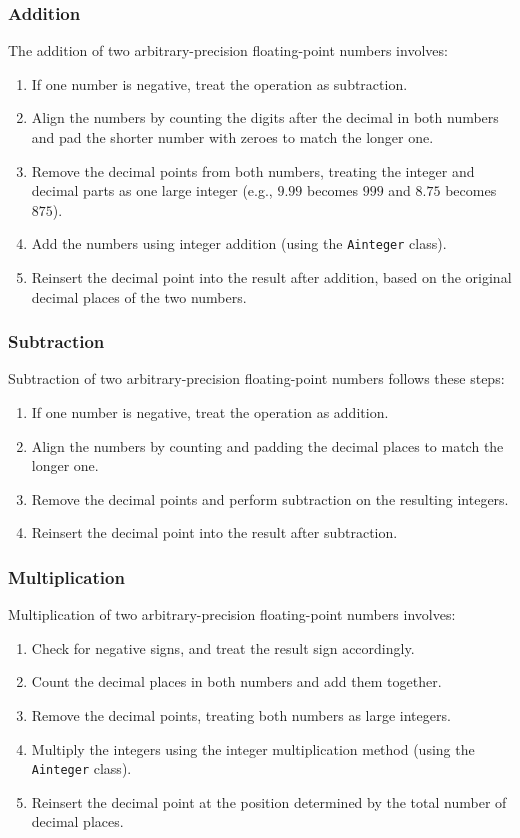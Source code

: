 \documentclass[12pt]{article}
\begin{document}
\subsubsection{Addition}
The addition of two arbitrary-precision floating-point numbers involves:
\begin{enumerate}
    \item If one number is negative, treat the operation as subtraction.
    \item Align the numbers by counting the digits after the decimal in both numbers and pad the shorter number with zeroes to match the longer one.
    \item Remove the decimal points from both numbers, treating the integer and decimal parts as one large integer (e.g., \(9.99\) becomes \(999\) and \(8.75\) becomes \(875\)).
    \item Add the numbers using integer addition (using the \texttt{Ainteger} class).
    \item Reinsert the decimal point into the result after addition, based on the original decimal places of the two numbers.
\end{enumerate}


\subsubsection{Subtraction}
Subtraction of two arbitrary-precision floating-point numbers follows these steps:
\begin{enumerate}
    \item If one number is negative, treat the operation as addition.
    \item Align the numbers by counting and padding the decimal places to match the longer one.
    \item Remove the decimal points and perform subtraction on the resulting integers.
    \item Reinsert the decimal point into the result after subtraction.
\end{enumerate}

\subsubsection{Multiplication}
Multiplication of two arbitrary-precision floating-point numbers involves:
\begin{enumerate}
    \item Check for negative signs, and treat the result sign accordingly.
    \item Count the decimal places in both numbers and add them together.
    \item Remove the decimal points, treating both numbers as large integers.
    \item Multiply the integers using the integer multiplication method (using the \texttt{Ainteger} class).
    \item Reinsert the decimal point at the position determined by the total number of decimal places.
\end{enumerate}
\end{document}

